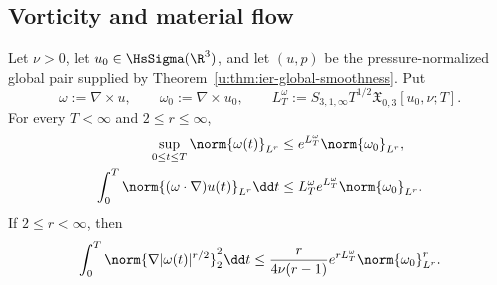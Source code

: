 \subsection{Vorticity and material flow}

\begin{theorem}
\label{u:thm:app-vorticity-amplification}
Let \(\nu>0\), let \(u_0\in\HsSigma(\R^3)\), and let \((u,p)\) be the
pressure-normalized global pair supplied by
Theorem~\ref{u:thm:ier-global-smoothness}.  Put
\[
 \omega:=\nabla\times u,
 \qquad
 \omega_0:=\nabla\times u_0,
 \qquad
 L_T^\omega:=S_{3,1,\infty}T^{1/2}
 \mathfrak X_{0,3}[u_0,\nu;T].
\]
For every \(T<\infty\) and \(2\le r\le\infty\),
\begin{align}
 \sup_{0\le t\le T}\norm{\omega(t)}_{L^r}
 &\le e^{L_T^\omega}\norm{\omega_0}_{L^r},
 \label{u:eq:app-vorticity-Lr-amplification}\\
 \int_0^T\norm{(\omega\cdot\nabla)u(t)}_{L^r}\dd t
 &\le L_T^\omega e^{L_T^\omega}\norm{\omega_0}_{L^r}.
 \label{u:eq:app-vortex-stretching-action}
\end{align}
If \(2\le r<\infty\), then
\begin{equation}
 \int_0^T\norm{\nabla|\omega(t)|^{r/2}}_2^2\dd t
 \le \frac{r}{4\nu(r-1)}e^{rL_T^\omega}
       \norm{\omega_0}_{L^r}^r.
 \label{u:eq:app-vorticity-dissipation}
\end{equation}
\end{theorem}

